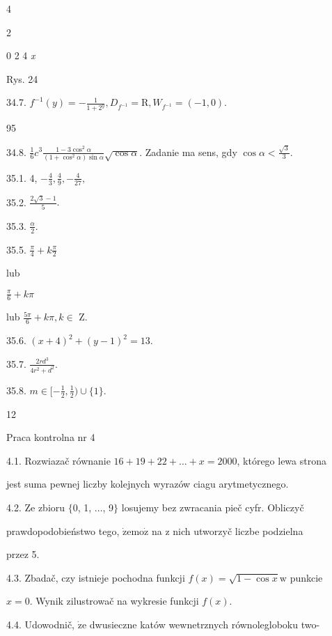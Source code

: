 \documentclass[a4paper,12pt]{article}
\begin{document}
4

2

0 2  4  {\it x}

Rys. 24

34.7. $f^{-1}(y)=-\displaystyle \frac{1}{1+2^{y}}, D_{f^{-1}}=\mathrm{R}, W_{f^{-1}}=(-1,0).$





95

34.8. $\displaystyle \frac{1}{6}c^{3}\frac{1-3\cos^{2}\alpha}{(1+\cos^{2}\alpha)\sin\alpha}\sqrt{\cos\alpha}$. Zadanie ma sens, gdy $\displaystyle \cos\alpha<\frac{\sqrt{3}}{3}.$

35.1. 4, $-\displaystyle \frac{4}{3}, \displaystyle \frac{4}{9}, -\displaystyle \frac{4}{27},$

35.2. $\displaystyle \frac{2\sqrt{3}-1}{5}.$

35.3. $\displaystyle \frac{\alpha}{2}.$

35.5. $\displaystyle \frac{\pi}{4}+k\frac{\pi}{2}$

lub

$\displaystyle \frac{\pi}{6}+k\pi$

lub $\displaystyle \frac{5\pi}{6}+k\pi,  k\in$ Z.

35.6. $(x+4)^{2}+(y-1)^{2}=13.$

35.7. $\displaystyle \frac{2rd^{3}}{4r^{2}+d^{2}}.$

35.8. $ m\in [-\displaystyle \frac{1}{2},\frac{1}{2})\cup\{1\}.$





12

Praca kontrolna nr 4

4.1. Rozwiazač równanie $16+19+22+\ldots+x=2000$, którego lewa strona

jest suma pewnej liczby kolejnych wyrazów ciagu arytmetycznego.

4.2. Ze zbioru $\{0$, 1, $\ldots$, 9$\}$ losujemy bez zwracania pieč cyfr. Obliczyč

prawdopodobieństwo tego, $\dot{\mathrm{z}}\mathrm{e}\mathrm{m}\mathrm{o}\dot{\mathrm{z}}$ na $\mathrm{z}$ nich utworzyč liczbe podzielna

przez 5.

4.3. Zbadač, czy istnieje pochodna funkcji $f(x) = \sqrt{1-\cos x}\mathrm{w}$ punkcie

$x=0$. Wynik zilustrowač na wykresie funkcji $f(x).$

4.4. Udowodnič, $\dot{\mathrm{z}}\mathrm{e}$ dwusieczne katów wewnetrznych równolegloboku two-
\end{document}
